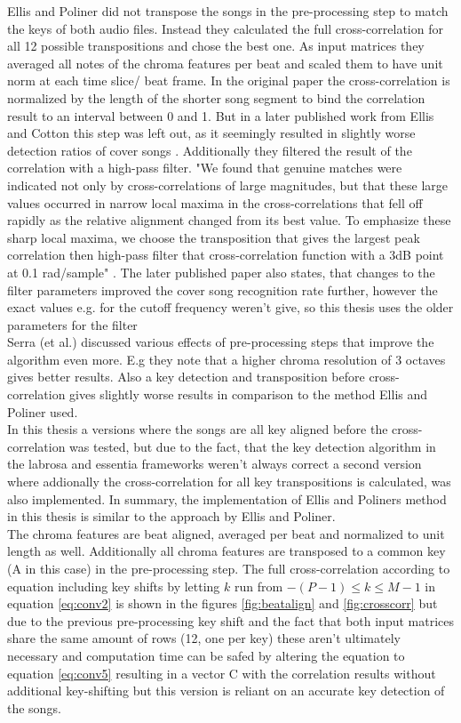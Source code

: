 Ellis and Poliner did not transpose the songs in the pre-processing step to match the keys of both audio files. Instead they calculated the full cross-correlation for all 12 possible transpositions and chose the best one. 
As input matrices they averaged all notes of the chroma features per beat and scaled them to have unit norm at each time slice/ beat frame.
In the original paper the cross-correlation is normalized by the length of the shorter song segment to bind the correlation result to an interval between 0 and 1. But in a later published work from Ellis and Cotton this step was left out, as it seemingly resulted in slightly worse detection ratios of cover songs \cite{cover802}. 
Additionally they filtered the result of the correlation with a high-pass filter. "We found that genuine matches were indicated not only by cross-correlations of large magnitudes, but that these large values occurred in narrow local maxima in the cross-correlations that fell off rapidly as the relative alignment changed from its best value. To emphasize these sharp local maxima, we choose the transposition that gives the largest peak correlation then high-pass filter that cross-correlation function with a 3dB point at 0.1 rad/sample" \cite[p. 1431]{chroma3}. The later published paper \cite{cover802} also states, that changes to the filter parameters improved the cover song recognition rate further, however the exact values e.g. for the cutoff frequency weren't give, so this thesis uses the older parameters for the filter\\
Serra (et al.) discussed various effects of pre-processing steps that improve the algorithm even more. E.g they note that a higher chroma resolution of 3 octaves gives better results. Also a key detection and transposition before cross-correlation gives slightly worse results in comparison to the method Ellis and Poliner used.\\ 
In this thesis a versions where the songs are all key aligned before the cross-correlation was tested, but due to the fact, that the key detection algorithm in the labrosa and essentia frameworks weren't always correct a second version where addionally the cross-correlation for all key transpositions is calculated, was also implemented. 
In summary, the implementation of Ellis and Poliners method in this thesis is similar to the approach by Ellis and Poliner.\\ The chroma features are beat aligned, averaged per beat and normalized to unit length as well. Additionally all chroma features are transposed to a common key (A in this case) in the pre-processing step. The full cross-correlation according to equation including key shifts by letting $k$ run from $-(P - 1) \leq k \leq M - 1$ in equation \ref{eq:conv2} is shown in the figures \ref{fig:beatalign} and \ref{fig:crosscorr} but due to the previous pre-processing key shift and the fact that both input matrices share the same amount of rows (12, one per key) these aren't ultimately necessary and computation time can be safed by altering the equation to equation \ref{eq:conv5} resulting in a vector C with the correlation results without additional key-shifting but this version is reliant on an accurate key detection of the songs.
